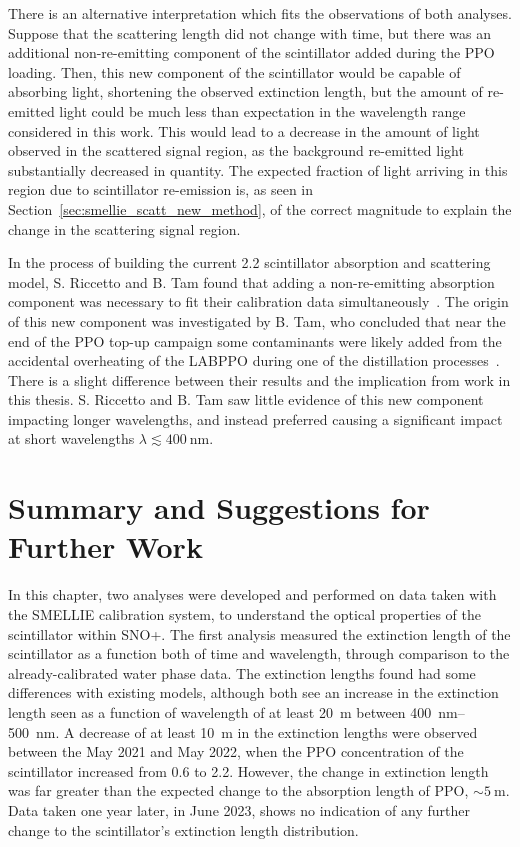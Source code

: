 There is an alternative interpretation which fits the observations of both analyses. Suppose that the scattering length did not change with time, but there was an additional non-re-emitting component of the scintillator added during the PPO loading. Then, this new component of the scintillator would be capable of absorbing light, shortening the observed extinction length, but the amount of re-emitted light could be much less than expectation in the wavelength range considered in this work. This would lead to a decrease in the amount of light observed in the scattered signal region, as the background re-emitted light substantially decreased in quantity. The expected fraction of light arriving in this region due to scintillator re-emission is, as seen in Section~\ref{sec:smellie_scatt_new_method}, of the correct magnitude to explain the change in the scattering signal region.

In the process of building the current \SI{2.2}{\gpl} scintillator absorption and scattering model, S. Riccetto and B. Tam found that adding a non-re-emitting absorption component was necessary to fit their calibration data simultaneously~\cite{kaptanogluDocumentationAttenuationStudies2022}. %
The origin of this new component was investigated by B. Tam, who concluded that near the end of the PPO top-up campaign some contaminants were likely added from the accidental overheating of the LABPPO during one of the distillation processes~\cite{tamAttenuationMeasurements2022}. %
There is a slight difference between their results and the implication from work in this thesis. S. Riccetto and B. Tam saw little evidence of this new component impacting longer wavelengths, and instead preferred causing a significant impact at short wavelengths $\lambda\lesssim\SI{400}{\nm}$.

\section{Summary and Suggestions for Further Work}
In this chapter, two analyses were developed and performed on data taken with the SMELLIE calibration system, to understand the optical properties of the scintillator within SNO+. The first analysis measured the extinction length of the scintillator as a function both of time and wavelength, through comparison to the already-calibrated water phase data. The extinction lengths found had some differences with existing models, although both see an increase in the extinction length seen as a function of wavelength of at least \SI{20}{\metre} between \SIrange{400}{500}{\nm}. A decrease of at least \SI{10}{\metre} in the extinction lengths were observed between the May 2021 and May 2022, when the PPO concentration of the scintillator increased from \SI{0.6}{\gpl} to \SI{2.2}{\gpl}. However, the change in extinction length was far greater than the expected change to the absorption length of PPO, $\sim\SI{5}{\metre}$. Data taken one year later, in June 2023, shows no indication of any further change to the scintillator's extinction length distribution.

